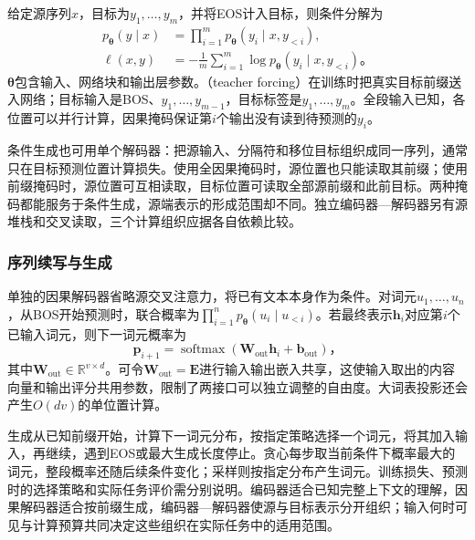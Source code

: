 给定源序列$x$，目标为$y_1,\ldots,y_m$，并将EOS计入目标，则条件分解为
\begin{equation}
  \begin{aligned}
    p_{\bm\theta}(y\mid x)
      &=\prod_{i=1}^{m}p_{\bm\theta}(y_i\mid x,y_{<i}),\\
    \ell(x,y)&=-\frac1m\sum_{i=1}^{m}
          \log p_{\bm\theta}(y_i\mid x,y_{<i})\text{。}
  \end{aligned}
  \label{eq:transformer-conditional-loss}
\end{equation}
$\bm\theta$包含输入、网络块和输出层参数。（teacher forcing）在训练时把真实目标前缀送入网络；目标输入是BOS、$y_1,\ldots,y_{m-1}$，目标标签是$y_1,\ldots,y_m$。全段输入已知，各位置可以并行计算，因果掩码保证第$i$个输出没有读到待预测的$y_i$。

条件生成也可用单个解码器：把源输入、分隔符和移位目标组织成同一序列，通常只在目标预测位置计算损失。使用全因果掩码时，源位置也只能读取其前缀；使用前缀掩码时，源位置可互相读取，目标位置可读取全部源前缀和此前目标。两种掩码都能服务于条件生成，源端表示的形成范围却不同。独立编码器—解码器另有源堆栈和交叉读取，三个计算组织应据各自依赖比较。

\subsubsection{序列续写与生成}

单独的因果解码器省略源交叉注意力，将已有文本本身作为条件。对词元$u_1,\ldots,u_n$，从BOS开始预测时，联合概率为$\prod_{i=1}^n p_{\bm\theta}(u_i\mid u_{<i})$。若最终表示$\bm h_i$对应第$i$个已输入词元，则下一词元概率为
\begin{equation}
  \bm p_{i+1}=\operatorname{softmax}
     (\bm W_{\mathrm{out}}\bm h_i+\bm b_{\mathrm{out}})\text{，}
  \label{eq:transformer-vocabulary-head}
\end{equation}
其中$\bm W_{\mathrm{out}}\in\mathbb R^{v\times d}$。可令$\bm W_{\mathrm{out}}=\bm E$进行输入输出嵌入共享，这使输入取出的内容向量和输出评分共用参数，限制了两接口可以独立调整的自由度。大词表投影还会产生$O(dv)$的单位置计算。

生成从已知前缀开始，计算下一词元分布，按指定策略选择一个词元，将其加入输入，再继续，遇到EOS或最大生成长度停止。贪心每步取当前条件下概率最大的词元，整段概率还随后续条件变化；采样则按指定分布产生词元。训练损失、预测时的选择策略和实际任务评价需分别说明。编码器适合已知完整上下文的理解，因果解码器适合按前缀生成，编码器—解码器使源与目标表示分开组织；输入何时可见与计算预算共同决定这些组织在实际任务中的适用范围。

